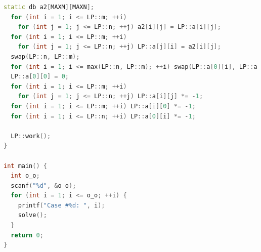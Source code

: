 \documentclass[twoside]{article}
\begin{document}
\begin{lstlisting}[language=c++]
  static db a2[MAXM][MAXN];
  for (int i = 1; i <= LP::m; ++i)
    for (int j = 1; j <= LP::n; ++j) a2[i][j] = LP::a[i][j];
  for (int i = 1; i <= LP::m; ++i)
    for (int j = 1; j <= LP::n; ++j) LP::a[j][i] = a2[i][j];
  swap(LP::n, LP::m);
  for (int i = 1; i <= max(LP::n, LP::m); ++i) swap(LP::a[0][i], LP::a[i][0]);
  LP::a[0][0] = 0;
  for (int i = 1; i <= LP::m; ++i)
    for (int j = 1; j <= LP::n; ++j) LP::a[i][j] *= -1;
  for (int i = 1; i <= LP::m; ++i) LP::a[i][0] *= -1;
  for (int i = 1; i <= LP::n; ++i) LP::a[0][i] *= -1;

  LP::work();
}

int main() {
  int o_o;
  scanf("%d", &o_o);
  for (int i = 1; i <= o_o; ++i) {
    printf("Case #%d: ", i);
    solve();
  }
  return 0;
}

\end{lstlisting}
\end{document}
